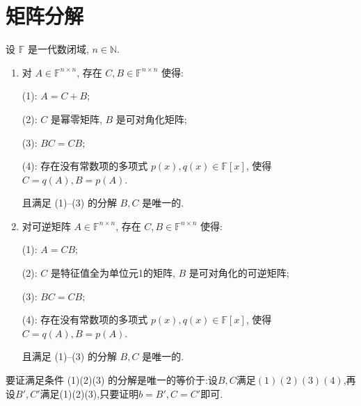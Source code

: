\documentclass[../../main.tex]{subfiles}
\begin{document}
\section{矩阵分解}

\begin{theorem}\label{theorem:Jordan-Chevalley分解}
设 \( \mathbb{F} \) 是一代数闭域, \( n \in \mathbb{N} \).
\begin{enumerate}
\item 对 \( A \in \mathbb{F}^{n \times n} \), 存在 \( C, B \in \mathbb{F}^{n \times n} \) 使得:

(1): \( A = C + B \);

(2): \( C \) 是幂零矩阵, \( B \) 是可对角化矩阵;

(3): \( BC = CB \);

(4): 存在没有常数项的多项式 \( p(x), q(x) \in \mathbb{F}[x] \), 使得 \( C = q(A), B = p(A) \). 

且满足 (1)--(3) 的分解 \( B, C \) 是唯一的.


\item  对可逆矩阵 \( A \in \mathbb{F}^{n \times n} \), 存在 \( C, B \in \mathbb{F}^{n \times n} \) 使得:

(1): \( A = CB \);

(2): \( C \) 是特征值全为单位元1的矩阵, \( B \) 是可对角化的可逆矩阵;

(3): \( BC = CB \);

(4): 存在没有常数项的多项式 \( p(x), q(x) \in \mathbb{F}[x] \), 使得 \( C = q(A), B = p(A) \).

且满足 (1)--(3) 的分解 \( B, C \) 是唯一的.
\end{enumerate}
\end{theorem}
\begin{remark}
要证满足条件 (1)(2)(3) 的分解是唯一的等价于:设$B,C$满足$(1)(2)(3)(4)$,再设$B',C'$满足(1)(2)(3),只要证明$b=B',C=C'$即可.
\end{remark}
\end{document}
